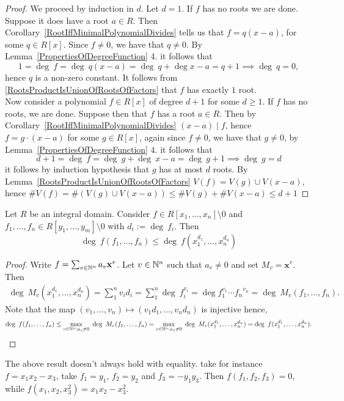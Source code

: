 \begin{proof}
    We proceed by induction in $d$. Let $d = 1$. If $f$ has no roots we are done. Suppose it does have a root $a\in R$. Then Corollary~\ref{RootIffMinimalPolynomialDivides} tells us that $f = q(x-a)$, for some $q \in R[x]$. Since $f \neq 0$, we have that $q \neq 0$. By Lemma~\ref{PropertiesOfDegreeFunction} 4. it follows that
    $$1 = \deg \ f = \deg\ q(x-a) =\deg \ q + \deg x-a = q +1 \implies \deg \ q = 0,$$
    hence $q$ is a non-zero constant. It follows from \ref{RootsProductIsUnionOfRootsOfFactors} that $f$ has exactly $1$ root.\\
    Now consider a polynomial $f\in R[x]$ of degree $d+1$ for some $d\geq 1$. If $f$ has no roots, we are done. Suppose then that $f$ has a root $a\in R$. Then by Corollary~\ref{RootIffMinimalPolynomialDivides} $(x-a)\mid f$, hence $f = g\cdot(x-a)$ for some $g\in R[x]$, again since $f\neq 0$, we have that $g\neq 0$, by Lemma~\ref{PropertiesOfDegreeFunction} 4. it follows that 
    $$d+1 = \deg \ f = \deg \ g + \deg \ x-a = \deg \ g + 1 \implies \deg \ g = d$$
    it follows by induction hypothesis that $g$ has at most $d$ roots. By Lemma~\ref{RootsProductIsUnionOfRootsOfFactors} $V(f)=V(g)\cup V(x-a)$, hence $\#V(f) = \#\left(V(g)\cup V(x-a)\right)\leq \#V(g)+\#V(x-a)  \leq d + 1 $ 
\end{proof}
\begin{lemma}\label{WeightedBoundHasLargerDegreeThenEvaluation}
    Let $R$ be an integral domain. Consider $f\in R[x_1,\dots,x_n]\setminus 0$ and $f_1,\dots,f_n\in R[y_1,\dots,y_m]\setminus 0$ with $d_i:=\deg\ f_i$. Then 
    $$\deg \ f(f_1,\dots,f_n)\leq \deg\ f(x_1^{d_1},\dots,x_n^{d_n})$$
\end{lemma}
\begin{proof}
    Write $f= \sum_{v\in \mathbb{N}^n} a_v\mathbf{x}^v$. Let $v\in \mathbb{N}^n$ such that $a_v\neq 0$ and set $M_v = \mathbf{x}^v$. Then 
    \begin{align*} 
        \deg \ M_v(x_1^{d_1},\dots,x_n^{d_n}) = \sum_1^n v_id_i = \sum_1^n \deg \ f_i^{v_i} = \deg f_1^{v_1}\cdots{f_n}^{v_n} = \deg \ M_v(f_1,\dots,f_n).
    \end{align*}
    Note that the map $(v_1,\dots,v_n)\mapsto (v_1d_1,\dots,v_nd_n)$ is injective hence,
    $$\deg \ f(f_1,\dots,f_n)\leq \max_{v\in \N^n : a_v\neq 0}\ \deg \ M_v(f_1,\dots,f_n) = \max_{v\in \N^n :a_v\neq 0}\ \deg\ M_v(x_1^{d_1},\dots,x_n^{d_n}) = \deg \ f(x_1^{d_1},\dots,x_n^{d_n}).$$
\end{proof}
\begin{remark}
    The above result doesn't always hold with equality. take for instance $f=x_1x_2-x_3$, take $f_1=y_1$, $f_2=y_2$ and $f_3=-y_1y_3$. Then $f(f_1,f_2,f_3)=0$, while $f(x_1,x_2,x_3^2)=x_1x_2-x_3^2$.
\end{remark}
